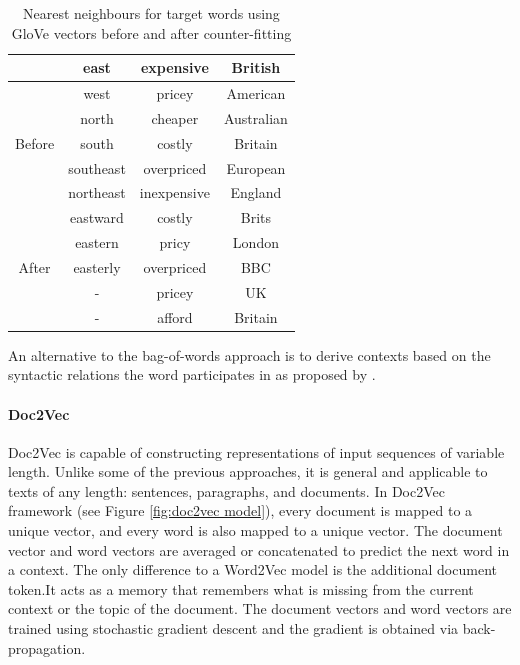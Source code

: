  \begin{table}[h]
 	\begin{center}
 		\begin{tabular}{ c c c c } 
 			\hline
 			& east & expensive & British \\
 			\hline
 			\multirow{5}{4em}{Before} &
 			
 			west & pricey &  American
 			\\ 
 			& north & cheaper & Australian\\ 
 			& south & costly & Britain\\ 
 			& southeast & overpriced & European\\
 			& northeast & inexpensive & England\\
 			\hline
 			\multirow{5}{4em}{After} & 
 			eastward & costly & Brits\\ 
 			& eastern & pricy & London\\ 
 			& easterly & overpriced & BBC\\ 
 			& - & pricey & UK\\ 
 			& - & afford & Britain\\ 
 			\hline
 		\end{tabular}
 		
 	\end{center}
 	
 	\caption{Nearest neighbours for target words using GloVe
 		vectors before and after counter-fitting} \label{tab:counter_fitting}
 \end{table}
 
 An alternative to
 the bag-of-words approach is to derive contexts
 based on the syntactic relations the word participates
 in as proposed by \cite{levy2014dependency}.


\paragraph{Doc2Vec}Doc2Vec is capable of constructing representations of input sequences of
variable length. Unlike some of the previous approaches, it is general and
applicable to texts of any length: sentences, paragraphs, and documents. In
Doc2Vec framework (see Figure \ref{fig:doc2vec model}), every document is mapped to a unique
vector, and every word is also mapped to a unique vector. The document
vector and word vectors are averaged or concatenated to predict the next
word in a context. The only difference to a Word2Vec model is the additional
document token.It acts as a memory that remembers what is missing from
the current context or the topic of the document. The document vectors and
word vectors are trained using stochastic gradient descent and the gradient
is obtained via back-propagation.

